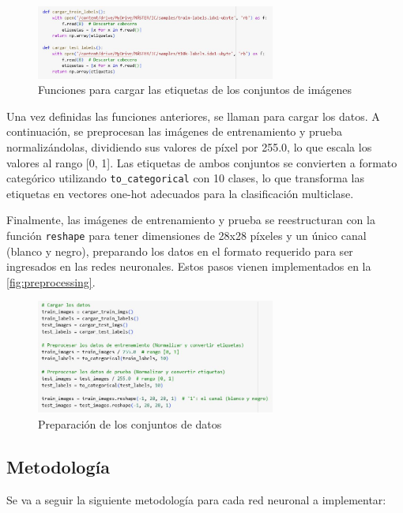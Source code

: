 \begin{figure}[H]
	\centering
	\includegraphics[width=0.7\textwidth]{imgs/function-load-labels.JPG}
	\caption{Funciones para cargar las etiquetas de los conjuntos de imágenes}
	\label{fig:function-load-labels}
\end{figure}

Una vez definidas las funciones anteriores, se llaman para cargar los datos. A continuación, se preprocesan las imágenes de entrenamiento y prueba normalizándolas, dividiendo sus valores de píxel por 255.0, lo que escala los valores al rango [0, 1]. Las etiquetas de ambos conjuntos se convierten a formato categórico utilizando \texttt{to\_categorical} con 10 clases, lo que transforma las etiquetas en vectores one-hot adecuados para la clasificación multiclase.

Finalmente, las imágenes de entrenamiento y prueba se reestructuran con la función \texttt{reshape} para tener dimensiones de 28x28 píxeles y un único canal (blanco y negro), preparando los datos en el formato requerido para ser ingresados en las redes neuronales. Estos pasos vienen implementados en la \autoref{fig:preprocessing}.

\begin{figure}[H]
	\centering
	\includegraphics[width=0.7\textwidth]{imgs/preprocessing.JPG}
	\caption{Preparación de los conjuntos de datos}
	\label{fig:preprocessing}
\end{figure}

\subsection{Metodología}

Se va a seguir la siguiente metodología para cada red neuronal a implementar:

